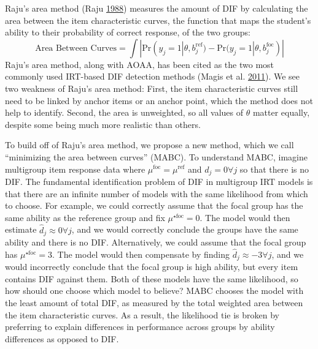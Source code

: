 \documentclass[
  11pt,
]{article}
\begin{document}
Raju's area method (Raju \protect\hyperlink{ref-raju1988area}{1988}) measures the amount of DIF by calculating the area between the item characteristic curves, the function that maps the student's ability to their probability of correct response, of the two groups:
\[
\text{Area Between Curves} = \int |\text{Pr}(y_j = 1| \theta, b_j^{\text{ref}}) - \text{Pr}(y_j = 1| \theta, b_j^{\text{foc}})|
\]
Raju's area method, along with AOAA, has been cited as the two most commonly used IRT-based DIF detection methods (Magis et al. \protect\hyperlink{ref-magis2011generalized}{2011}). We see two weakness of Raju's area method: First, the item characteristic curves still need to be linked by anchor items or an anchor point, which the method does not help to identify. Second, the area is unweighted, so all values of \(\theta\) matter equally, despite some being much more realistic than others.

To build off of Raju's area method, we propose a new method, which we call \enquote{minimizing the area between curves} (MABC). To understand MABC, imagine multigroup item response data where \(\mu^{\text{foc}} = \mu^{\text{ref}}\) and \(d_j = 0 \forall j\) so that there is no DIF. The fundamental identification problem of DIF in multigroup IRT models is that there are an infinite number of models with the same likelihood from which to choose. For example, we could correctly assume that the focal group has the same ability as the reference group and fix \(\mu^{\star\text{foc}} = 0\). The model would then estimate \(\hat d_j \approx 0 \forall j\), and we would correctly conclude the groups have the same ability and there is no DIF. Alternatively, we could assume that the focal group has \(\mu^{\star\text{foc}} = 3\). The model would then compensate by finding \(\hat d_j \approx -3 \forall j\), and we would incorrectly conclude that the focal group is high ability, but every item contains DIF against them. Both of these models have the same likelihood, so how should one choose which model to believe? MABC chooses the model with the least amount of total DIF, as measured by the total weighted area between the item characteristic curves. As a result, the likelihood tie is broken by preferring to explain differences in performance across groups by ability differences as opposed to DIF.
\end{document}
